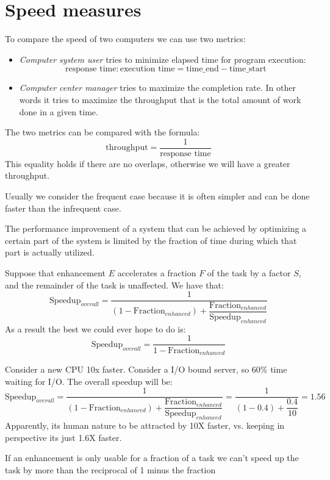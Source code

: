 \section{Speed measures}

To compare the speed of two computers we can use two metrics: 
\begin{itemize}
    \item \textit{Computer system user} tries to minimize elapsed time for program execution:
        \[\text{response time} : \text{execution time} = \text{time\_end} - \text{time\_start}\]
    \item \textit{Computer center manager} tries to maximize the completion rate. 
        In other words it tries to maximize the throughput that is the total amount of work done in a given time. 
\end{itemize}
The two metrics can be compared with the formula: 
\[\text{throughput}=\dfrac{1}{\text{response time}}\]
This equality holds if there are no overlaps, otherwise we will have a greater throughput. 

Usually we consider the frequent case because it is often simpler and can be done faster than the infrequent case. 
\begin{theorem}
    The performance improvement of a system that can be achieved by optimizing a certain part of the system is limited by the fraction of time during which that part is actually utilized.
\end{theorem}

Suppose that enhancement $E$ accelerates a fraction $F$ of the task by a factor $S$, and the remainder of the task is unaffected. 
We have that: 
\[\text{Speedup}_{overall}=\dfrac{1}{\left(1-\text{Fraction}_{enhanced}\right)+\dfrac{\text{Fraction}_{enhanced}}{\text{Speedup}_{enhanced}}}\]
As a result the best we could ever hope to do is: 
\[\text{Speedup}_{overall}=\dfrac{1}{1-\text{Fraction}_{enhanced}}\]
\begin{example}
    Consider a new CPU 10x faster. 
    Consider a I/O bound server, so 60\% time waiting for I/O. 
    The overall speedup will be: 
    \[\text{Speedup}_{overall}=\dfrac{1}{\left(1-\text{Fraction}_{enhanced}\right)+\dfrac{\text{Fraction}_{enhanced}}{\text{Speedup}_{enhanced}}}=\dfrac{1}{\left(1-0.4\right)+\dfrac{0.4}{10}}=1.56\]
    Apparently, its human nature to be attracted by 10X faster, vs. keeping in perspective its just 1.6X faster. 
\end{example}
\begin{corollary}
    If an enhancement is only usable for a fraction of a task we can't speed up the task by more than the reciprocal of 1 minus the fraction
\end{corollary}